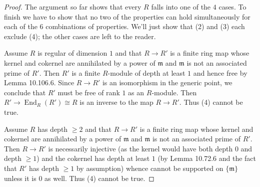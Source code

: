 \documentclass[UTF8,11pt]{ctexart}
\newcommand{\End}{\operatorname{End}}
\begin{document}
\begin{proof}
The argument so far shows that every $R$ falls into one of the $4$ cases. To finish we have to show that no two of the properties can hold simultaneously for each of the $6$ combinations of properties. We'll just show that (2) and (3) each exclude (4); the other cases are left to the reader.

Assume $R$ is regular of dimension $1$ and that $R\to R'$ is a finite ring map whose kernel and cokernel are annihilated by a power of $\mathfrak m$ and $\mathfrak m$ is not an associated prime of $R'$. Then $R'$ is a finite $R$-module of depth at least $1$ and hence free by Lemma 10.106.6. Since $R\to R'$ is an isomorphism in the generic point, we conclude that $R'$ must be free of rank $1$ as an $R$-module. Then $R'\to\End_R(R')\cong R$ is an inverse to the map $R\to R'$. Thus (4) cannot be true.

Assume $R$ has depth $\geq2$ and that $R\to R'$ is a finite ring map whose kernel and cokernel are annihilated by a power of $\mathfrak m$ and $\mathfrak m$ is not an associated prime of $R'$. Then $R\to R'$ is necessarily injective (as the kernel would have both depth $0$ and depth $\geq1$) and the cokernel has depth at least $1$ (by Lemma 10.72.6 and the fact that $R'$ has depth $\geq1$ by assumption) whence cannot be supported on $\{\mathfrak m\}$ unless it is $0$ as well. Thus (4) cannot be true.
\end{proof}
\end{document}
